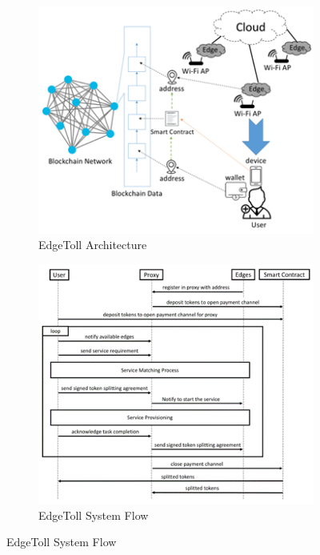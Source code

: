 \documentclass[a4paper,12pt,oneside, utf8x]{report}
\begin{document}
	\begin{figure}[H]
        \centering
        \begin{subfigure}[b]{.44\textwidth}
            \centering \includegraphics[width=0.99\linewidth]{figures/2-3.png}
            \caption{EdgeToll Architecture \cite{n18}}
            \label{f23et}
        \end{subfigure} 
        \begin{subfigure}[b]{.44\textwidth}
            \centering \includegraphics[width=0.99\linewidth]{figures/2-4.png}
            \caption{EdgeToll System Flow \cite{n18}}
            \label{f24et}
        \end{subfigure}
        \label{f2324}
    \end{figure}
    
\end{document}
